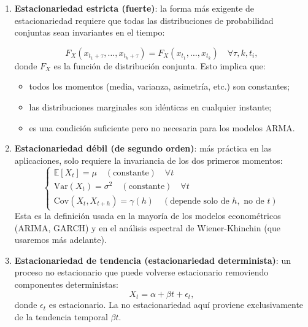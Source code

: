 	\begin{enumerate}
		\item \textbf{Estacionariedad estricta (fuerte)}: la forma más exigente de estacionariedad requiere que todas las distribuciones de probabilidad conjuntas sean invariantes en el tiempo:

		\begin{equation}
			F_X(x_{t_1+\tau}, \ldots, x_{t_k+\tau}) = F_X(x_{t_1}, \ldots, x_{t_k}) \quad \forall \tau, k, t_i,
		\end{equation}
		donde $F_X$ es la función de distribución conjunta. Esto implica que:
		\begin{itemize}
			\item todos los momentos (media, varianza, asimetría, etc.) son constantes;
			\item las distribuciones marginales son idénticas en cualquier instante;
			\item es una condición suficiente pero no necesaria para los modelos ARMA.
		\end{itemize}

		\item \textbf{Estacionariedad débil (de segundo orden)}: más práctica en las aplicaciones, solo requiere la invariancia de los dos primeros momentos:
		\begin{equation}
			\begin{cases}
				\mathbb{E}[X_t] = \mu \quad (\text{constante}) \quad \forall t \\
				\text{Var}(X_t) = \sigma^2 \quad (\text{constante}) \quad \forall t \\
				\text{Cov}(X_t, X_{t+h}) = \gamma(h) \quad (\text{depende solo de } h, \text{ no de } t)
			\end{cases}
		\end{equation}
		Esta es la definición usada en la mayoría de los modelos econométricos (ARIMA, GARCH) y en el análisis espectral de Wiener-Khinchin (que usaremos más adelante).

		\item \textbf{Estacionariedad de tendencia (estacionariedad determinista)}: un proceso no estacionario que puede volverse estacionario removiendo componentes deterministas:
		\begin{equation}
			X_t = \alpha + \beta t + \epsilon_t,
		\end{equation}
		donde $\epsilon_t$ es estacionario. La no estacionariedad aquí proviene exclusivamente de la tendencia temporal $\beta t$.
	\end{enumerate}


